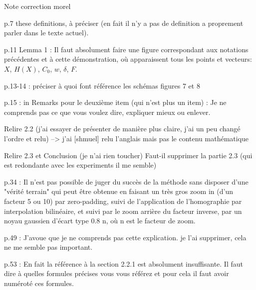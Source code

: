 Note correction morel

p.7 these definitions, à préciser (en fait il n’y a pas de definition a proprement parler dans le texte actuel).

p.11 Lemma 1 :  Il faut absolument faire une figure correspondant aux notations précédentes et à cette démonstration, où apparaissent tous  les points et vecteurs: $X$, $H(X)$, $C_0$, $w$, $\delta$, $F$.

p.13-14 : préciser à quoi font référence les schémas figures 7 et 8

p.15 : in Remarks pour le deuxième item (qui n’est plus un item) :  Je ne comprends pas ce que vous voulez dire, expliquer mieux ou enlever.

Relire 2.2 (j’ai essayer de présenter de manière plus claire, j’ai un peu changé l’ordre et relu)
--> j'ai [shmuel] relu l'anglais mais pas le contenu mathématique

Relire 2.3 et Conclusion (je n’ai rien toucher) 
Faut-il supprimer la partie 2.3 (qui est redondante avec les experiments il me semble)

p.34 : Il n'est pas possible de juger du succès de la méthode sans disposer d'une "vérité terrain" qui peut être obtenue en faisant un très gros zoom in (d'un facteur 5 ou 10) par zero-padding, suivi de l'application de l'homographie par interpolation bilinéaire, et suivi par le zoom arrière du facteur inverse, par un noyau gaussien d'écart type 0.8 n, où n est  le facteur de zoom.

p.49 : J'avoue que je ne comprends pas cette explication. 
je l’ai supprimer, cela ne me semble pas important.

p.53 : En fait la référence à la section 2.2.1 est absolument insuffisante. Il faut dire à quelles formules précises vous vous référez et pour cela il faut avoir numéroté ces formules.
